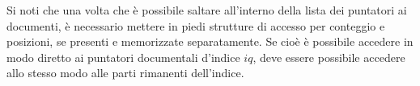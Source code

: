 Si noti che una volta che è possibile saltare all'interno della lista dei puntatori ai documenti, è necessario mettere in piedi strutture di accesso per conteggio e posizioni, se presenti e memorizzate separatamente. Se cioè è possibile accedere in modo diretto ai puntatori documentali d'indice $iq$, deve essere possibile accedere allo stesso modo alle parti rimanenti dell'indice.
